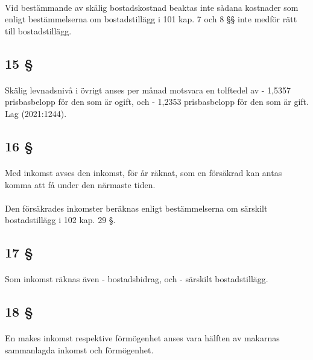 \documentclass[a4paper,notitlepage,openany,10pt]{book}
\begin{document}
\paragraph*{}
Vid bestämmande av skälig bostadskostnad beaktas inte sådana kostnader som enligt bestämmelserna om bostadstillägg i 101 kap. 7 och 8 §§ inte medför rätt till bostadstillägg.
\subsection*{15 §}
\paragraph*{}
Skälig levnadsnivå i övrigt anses per månad motsvara en tolftedel av
\newline - 1,5357 prisbasbelopp för den som är ogift, och
\newline - 1,2353 prisbasbelopp för den som är gift.
Lag (2021:1244).
\subsection*{16 §}
\paragraph*{}
Med inkomst avses den inkomst, för år räknat, som en försäkrad kan antas komma att få under den närmaste tiden.
\paragraph*{}
Den försäkrades inkomster beräknas enligt bestämmelserna om särskilt bostadstillägg i 102 kap. 29 §.
\subsection*{17 §}
\paragraph*{}
Som inkomst räknas även
\newline - bostadsbidrag, och
\newline - särskilt bostadstillägg.
\subsection*{18 §}
\paragraph*{}
En makes inkomst respektive förmögenhet anses vara hälften av makarnas sammanlagda inkomst och förmögenhet.
\end{document}

